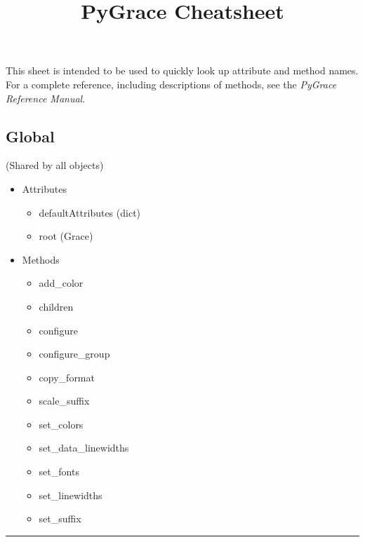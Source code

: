 \documentclass[10pt]{article}
\title{PyGrace Cheatsheet}
\date{}
\begin{document}
\maketitle
\pagestyle{empty}
\thispagestyle{empty}
\renewcommand{\labelitemi}{}
\renewcommand{\labelitemii}{}
\noindent This sheet is intended to be used to quickly look up attribute and method names.  For a complete reference, including descriptions of methods, see the \textit{PyGrace Reference Manual}.
\begin{multicols}{4}
\footnotesize
\subsection*{\footnotesize Global}
(Shared by all objects)
\begin{itemize}
\item Attributes
\begin{itemize}
\item defaultAttributes (dict)
\item root (Grace)
\end{itemize}
\item Methods
\begin{itemize}
\item add\_color
\item children
\item configure
\item configure\_group
\item copy\_format
\item scale\_suffix
\item set\_colors
\item set\_data\_linewidths
\item set\_fonts
\item set\_linewidths
\item set\_suffix
\end{itemize}
\end{itemize}
\vspace{0.5em}
\hrule
\vspace{0.1em}

\end{multicols}
\end{document}
